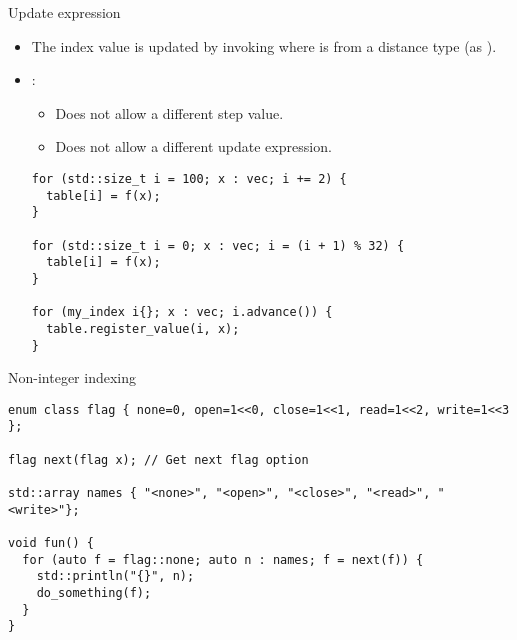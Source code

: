 \begin{frame}[t,fragile]{Update expression}
\begin{itemize}
  \item The index value is updated by invoking  where  is
        from a distance type (as ).

  \vfill\pause
  \item {}:
    \begin{itemize}
      \item Does not allow a different step value.
      \item Does not allow a different update expression.
    \end{itemize}

\begin{lstlisting}
for (std::size_t i = 100; x : vec; i += 2) {
  table[i] = f(x);
}

for (std::size_t i = 0; x : vec; i = (i + 1) % 32) {
  table[i] = f(x);
}

for (my_index i{}; x : vec; i.advance()) {
  table.register_value(i, x);
} 
\end{lstlisting}

\end{itemize}
\end{frame}

\begin{frame}[t,fragile]{Non-integer indexing}
\begin{lstlisting}
enum class flag { none=0, open=1<<0, close=1<<1, read=1<<2, write=1<<3 };

flag next(flag x); // Get next flag option

std::array names { "<none>", "<open>", "<close>", "<read>", "<write>"};

void fun() {
  for (auto f = flag::none; auto n : names; f = next(f)) {
    std::println("{}", n);
    do_something(f);
  }
}
\end{lstlisting}
\end{frame}

